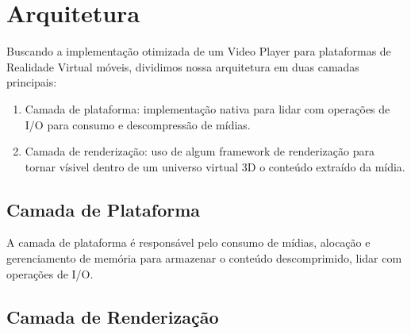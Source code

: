 \section{Arquitetura}


Buscando a implementação otimizada de um Video Player para plataformas de Realidade Virtual móveis, dividimos nossa arquitetura em duas camadas principais:

\begin{enumerate}
    \item Camada de plataforma: implementação nativa para lidar com operações de I/O para consumo e descompressão de mídias.
    \item Camada de renderização: uso de algum framework de renderização para tornar vísivel dentro de um universo virtual 3D o conteúdo extraído da mídia.
\end{enumerate}

\subsection{Camada de Plataforma}


A camada de plataforma é responsável pelo consumo de mídias, alocação e gerenciamento de memória para armazenar o conteúdo descomprimido, lidar com operações de I/O.

\subsection{Camada de Renderização}

